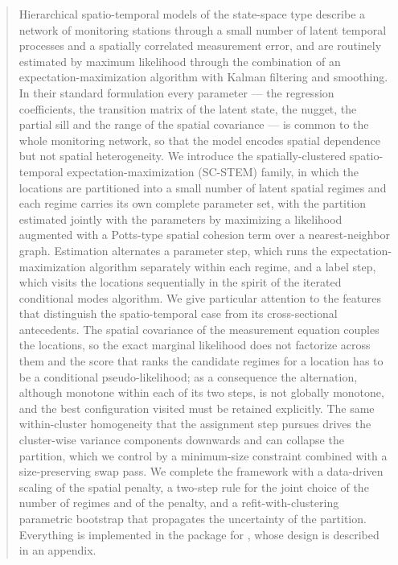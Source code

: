 \maketitle

\begin{abstract}
Hierarchical spatio-temporal models of the state-space type describe a network of monitoring stations through a small number of latent temporal processes and a spatially correlated measurement error, and are routinely estimated by maximum likelihood through the combination of an expectation-maximization algorithm with Kalman filtering and smoothing. In their standard formulation every parameter --- the regression coefficients, the transition matrix of the latent state, the nugget, the partial sill and the range of the spatial covariance --- is common to the whole monitoring network, so that the model encodes spatial dependence but not spatial heterogeneity. We introduce the spatially-clustered spatio-temporal expectation-maximization (SC-STEM) family, in which the locations are partitioned into a small number of latent spatial regimes and each regime carries its own complete parameter set, with the partition estimated jointly with the parameters by maximizing a likelihood augmented with a Potts-type spatial cohesion term over a nearest-neighbor graph. Estimation alternates a parameter step, which runs the expectation-maximization algorithm separately within each regime, and a label step, which visits the locations sequentially in the spirit of the iterated conditional modes algorithm. We give particular attention to the features that distinguish the spatio-temporal case from its cross-sectional antecedents. The spatial covariance of the measurement equation couples the locations, so the exact marginal likelihood does not factorize across them and the score that ranks the candidate regimes for a location has to be a conditional pseudo-likelihood; as a consequence the alternation, although monotone within each of its two steps, is not globally monotone, and the best configuration visited must be retained explicitly. The same within-cluster homogeneity that the assignment step pursues drives the cluster-wise variance components downwards and can collapse the partition, which we control by a minimum-size constraint combined with a size-preserving swap pass. We complete the framework with a data-driven scaling of the spatial penalty, a two-step rule for the joint choice of the number of regimes and of the penalty, and a refit-with-clustering parametric bootstrap that propagates the uncertainty of the partition. Everything is implemented in the \Stem{} package for \Rlang{}, whose design is described in an appendix.
\end{abstract}

